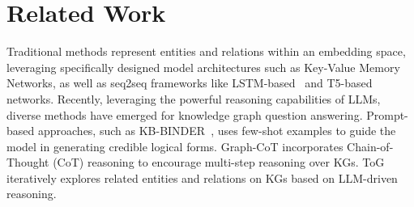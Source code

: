 \section{Related Work}
Traditional methods represent entities and relations within an embedding space, leveraging specifically designed model architectures such as Key-Value Memory Networks\cite{miller-etal-2016-key,das-etal-2017-question}, as well as seq2seq frameworks like LSTM-based~\cite{sun-etal-2018-open} and T5-based~\cite{shu-etal-2022-tiara} networks. Recently, leveraging the powerful reasoning capabilities of LLMs, diverse methods have emerged for knowledge graph question answering. Prompt-based approaches, such as KB-BINDER~\cite{kb-binder}, uses few-shot examples to guide the model in generating credible logical forms. Graph-CoT \cite{jin-etal-2024-graph} incorporates Chain-of-Thought (CoT) reasoning to encourage multi-step reasoning over KGs. ToG \cite{sun2023think} iteratively explores related entities and relations on KGs based on LLM-driven reasoning.


